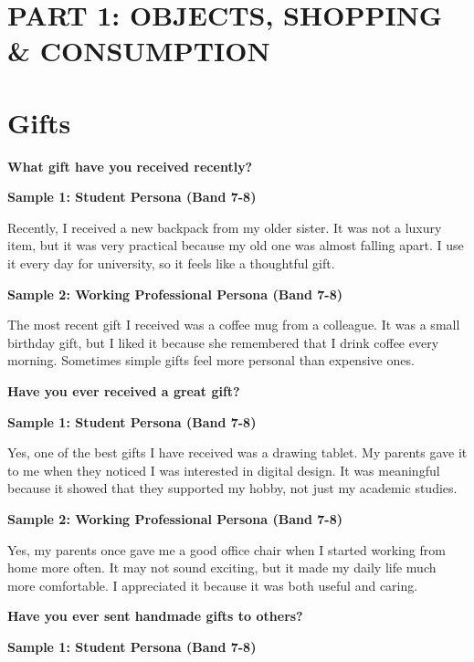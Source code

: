 \newpage

\section*{PART 1: OBJECTS, SHOPPING \& CONSUMPTION}

\section{Gifts}
\begin{ieltsquestion}
\textbf{What gift have you received recently?}
\end{ieltsquestion}
\textbf{Sample 1: Student Persona (Band 7-8)}

Recently, I received a new backpack from my older sister. It was not a luxury item, but it was very practical because my old one was almost falling apart. I use it every day for university, so it feels like a thoughtful gift.

\textbf{Sample 2: Working Professional Persona (Band 7-8)}

The most recent gift I received was a coffee mug from a colleague. It was a small birthday gift, but I liked it because she remembered that I drink coffee every morning. Sometimes simple gifts feel more personal than expensive ones.

\separator

\begin{ieltsquestion}
\textbf{Have you ever received a great gift?}
\end{ieltsquestion}
\textbf{Sample 1: Student Persona (Band 7-8)}

Yes, one of the best gifts I have received was a drawing tablet. My parents gave it to me when they noticed I was interested in digital design. It was meaningful because it showed that they supported my hobby, not just my academic studies.

\textbf{Sample 2: Working Professional Persona (Band 7-8)}

Yes, my parents once gave me a good office chair when I started working from home more often. It may not sound exciting, but it made my daily life much more comfortable. I appreciated it because it was both useful and caring.

\separator

\begin{ieltsquestion}
\textbf{Have you ever sent handmade gifts to others?}
\end{ieltsquestion}
\textbf{Sample 1: Student Persona (Band 7-8)}

